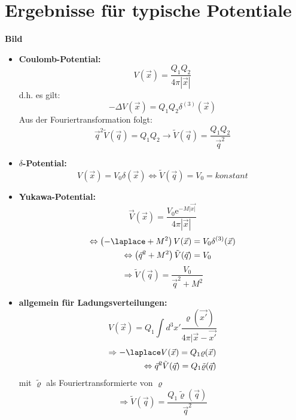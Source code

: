 \section{Ergebnisse für typische Potentiale}

\textbf{Bild} \\

\begin{itemize}
	\item \textbf{Coulomb-Potential:} \[ V\left( \vec{x} \right) = \frac{Q_1 
	Q_2}{4\pi \left|\vec{x}\right|} \] 
	d.h. es gilt: \[ - \Delta V\left( \vec{x} \right) = Q_1 Q_2 \delta^{(3)} 
	\left( \vec{x} \right) \] 
	Aus der Fouriertransformation folgt: \[ \vec{q}^2 \tilde{V}\left( \vec{q} 
	\right) = Q_1 Q_2 \to \tilde{V}\left( \vec{q} \right) = \frac{Q_1 
	Q_2}{\vec{q}^2} \]
	\item $\delta$\textbf{-Potential:} \[V \left( \vec{x} \right) = V_0 \delta 
	(\vec{x}) \Longleftrightarrow \tilde{V}(\vec{q}) = V_0 = \mathit{konstant} 
	\]
	\item \textbf{Yukawa-Potential:} \[ \vec{V}(\vec{x}) = \frac{V_0 
	\mathrm{e}^{-M|\vec{x|}}}{4 \pi |\vec{x}|} \]
	\vspace{-0,5cm}
	\begin{align*}
		\Leftrightarrow \left( -\laplace + M^2 \right) V(\vec{x}) &= V_0 
		\delta^{(3)} (\vec{x}) \\
		\Leftrightarrow \left( \vec{q}^2 + M^2 \right) \tilde{V}(\vec{q}) &= 
		V_0 \\
	\end{align*}
	\vspace{-1cm}
	\[ \Longrightarrow \tilde{V}(\vec{q}) = \frac{V_0}{\vec{q}^2 + M^2} \]
		 
	\item \textbf{allgemein für Ladungsverteilungen:} \[ V(\vec{x}) = Q_1 \int 
	d^3x' \frac{\varrho(\vec{x'})}{4 \pi |\vec{x} - \vec{x'}} \]
	\begin{align*}
		\Rightarrow - \laplace V(\vec{x}) = Q_1 \varrho (\vec{x})  \\
		\Leftrightarrow \vec{q}^2 \tilde{V}(\vec{q}) = Q_1 
		\tilde{\varrho}(\vec{q})
	\end{align*}
	 mit $\tilde{\varrho}$ als Fouriertransformierte von $\varrho$
	\[ \Longrightarrow \tilde{V}(\vec{q}) = \frac{Q_1 
	\tilde{\varrho}(\vec{q})}{\vec{q}^2} \]
\end{itemize}

